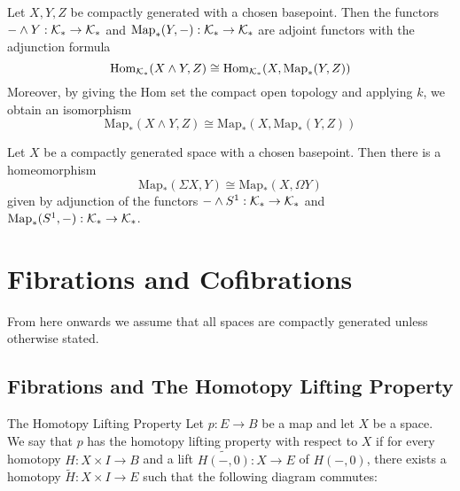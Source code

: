 \documentclass[a4paper]{article}
\begin{document}
\begin{thm}{}{} Let $X,Y,Z$ be compactly generated with a chosen basepoint. Then the functors $-\wedge Y:\mathcal{K}_\ast\to\mathcal{K}_\ast$ and $\text{Map}_\ast(Y,-):\mathcal{K}_\ast\to\mathcal{K}_\ast$ are adjoint functors with the adjunction formula $$\operatorname{Hom}_{\mathcal{K}_\ast}(X\wedge Y,Z)\cong\operatorname{Hom}_{\mathcal{K}_\ast}(X,\text{Map}_\ast(Y,Z))$$ Moreover, by giving the Hom set the compact open topology and applying $k$, we obtain an isomorphism $$\text{Map}_\ast(X\wedge Y,Z)\cong\text{Map}_\ast(X,\text{Map}_\ast(Y,Z))$$
\end{thm}

\begin{crl}{}{} Let $X$ be a compactly generated space with a chosen basepoint. Then there is a homeomorphism $$\text{Map}_\ast(\Sigma X,Y)\cong\text{Map}_\ast(X,\Omega Y)$$ given by adjunction of the functors $-\wedge S^1:\mathcal{K}_\ast\to\mathcal{K}_\ast$ and $\text{Map}_\ast(S^1,-):\mathcal{K}_\ast\to\mathcal{K}_\ast$. 
\end{crl}

\pagebreak
\section{Fibrations and Cofibrations}
From here onwards we assume that all spaces are compactly generated unless otherwise stated. 

\subsection{Fibrations and The Homotopy Lifting Property}
\begin{defn}{The Homotopy Lifting Property}{} Let $p:E\to B$ be a map and let $X$ be a space. We say that $p$ has the homotopy lifting property with respect to $X$ if for every homotopy $H:X\times I\to B$ and a lift $\widetilde{H(-,0)}:X\to E$ of $H(-,0)$, there exists a homotopy $\widetilde{H}:X\times I\to E$ such that the following diagram commutes: \\~\\
\\~\\
\end{defn}
\end{document}
